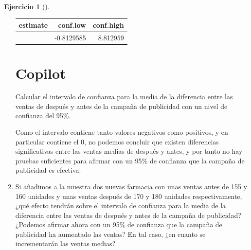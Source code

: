 \documentclass[
  a4paper,
]{scrreport}
\newenvironment{Shaded}{\begin{snugshade}}{\end{snugshade}}
\newcommand{\AttributeTok}[1]{\textcolor[rgb]{0.40,0.45,0.13}{#1}}
\newcommand{\CommentTok}[1]{\textcolor[rgb]{0.37,0.37,0.37}{#1}}
\newcommand{\ConstantTok}[1]{\textcolor[rgb]{0.56,0.35,0.01}{#1}}
\newcommand{\ExtensionTok}[1]{\textcolor[rgb]{0.00,0.23,0.31}{#1}}
\newcommand{\FunctionTok}[1]{\textcolor[rgb]{0.28,0.35,0.67}{#1}}
\newcommand{\NormalTok}[1]{\textcolor[rgb]{0.00,0.23,0.31}{#1}}
\newcommand{\SpecialCharTok}[1]{\textcolor[rgb]{0.37,0.37,0.37}{#1}}
\theoremstyle{definition}
\newtheorem{exercise}{Ejercicio}[chapter]
\theoremstyle{remark}
\begin{document}
\begin{exercise}[]
\begin{enumerate}
\begin{tcolorbox}
\begin{Shaded}
\end{Shaded}

  \begin{longtable}[]{@{}rrr@{}}
  \toprule\noalign{}
  estimate & conf.low & conf.high \\
  \midrule\noalign{}
  \endhead
  \bottomrule\noalign{}
  \endlastfoot
  4 & -0.8129585 & 8.812959 \\
  \end{longtable}

  \section{Copilot}

\begin{Shaded}
\begin{Highlighting}[]
\ExtensionTok{Calcular}\NormalTok{ el intervalo de confianza para la media de la diferencia entre las ventas de después y antes de la campaña de publicidad con un nivel de confianza del 95\%.}
\end{Highlighting}
\end{Shaded}

  Como el intervalo contiene tanto valores negativos como positivos, y
  en particular contiene el 0, no podemos concluir que existen
  diferencias significativas entre las ventas medias de después y antes,
  y por tanto no hay pruebas suficientes para afirmar con un 95\% de
  confianza que la campaña de publicidad es efectiva.

  \end{tcolorbox}
\item
  Si añadimos a la muestra dos nuevas farmacia con unas ventas antes de
  155 y 160 unidades y unas ventas después de 170 y 180 unidades
  respectivamente, ¿qué efecto tendrán sobre el intervalo de confianza
  para la media de la diferencia entre las ventas de después y antes de
  la campaña de publicidad? ¿Podemos afirmar ahora con un 95\% de
  confianza que la campaña de publicidad ha aumentado las ventas? En tal
  caso, ¿en cuanto se incrementarán las ventas medias?


\end{enumerate}
\end{exercise}
\end{document}
